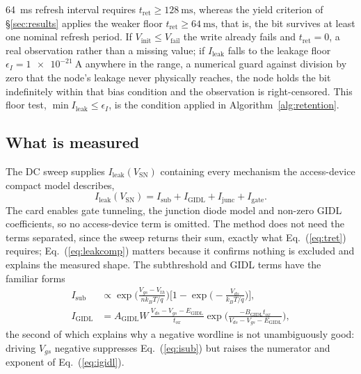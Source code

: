\documentclass[11pt,a4paper]{article}
\newcommand{\Vsn}{V_{\mathrm{SN}}}
\newcommand{\Vfail}{V_{\mathrm{fail}}}
\newcommand{\Ileak}{I_{\mathrm{leak}}}
\newcommand{\tret}{t_{\mathrm{ret}}}
\begin{document}
\SI{64}{\milli\second} refresh interval requires $\tret\ge\SI{128}{\milli\second}$,
whereas the yield criterion of \S\ref{sec:results} applies the weaker floor
$\tret\ge\SI{64}{\milli\second}$, that is, the bit survives at least one nominal
refresh period. If $V_{\mathrm{init}}\le\Vfail$ the write already fails and
$\tret=0$, a real observation rather than a missing value; if $\Ileak$ falls to the
leakage floor $\epsilon_I=\SI{1e-21}{\ampere}$ anywhere in the range, a numerical
guard against division by zero that the node's leakage never physically reaches,
the node holds the bit indefinitely within that bias condition and the observation
is right-censored. This floor test, $\min\Ileak\le\epsilon_I$, is the condition
applied in Algorithm~\ref{alg:retention}.

\subsection{What is measured}

The DC sweep supplies $\Ileak(\Vsn)$ containing every mechanism the access-device
compact model describes,
\begin{equation}
\Ileak(\Vsn) = I_{\mathrm{sub}} + I_{\mathrm{GIDL}}
+ I_{\mathrm{junc}} + I_{\mathrm{gate}} .
\label{eq:leakcomp}
\end{equation}
The card enables gate tunneling, the junction diode model and non-zero GIDL
coefficients, so no access-device term is omitted. The method does not need the terms separated,
since the sweep returns their sum, exactly what Eq.~(\ref{eq:tret}) requires;
Eq.~(\ref{eq:leakcomp}) matters because it confirms nothing is excluded and
explains the measured shape. The subthreshold and GIDL terms have the familiar
forms
\begin{align}
I_{\mathrm{sub}} &\propto
\exp\!\Big(\tfrac{V_{gs}-V_{th}}{n k_BT/q}\Big)
\Big[1-\exp\!\big(-\tfrac{V_{ds}}{k_BT/q}\big)\Big],
\label{eq:isub}\\
I_{\mathrm{GIDL}} &= A_{\mathrm{GIDL}} W\,
\frac{V_{ds}-V_{gs}-E_{\mathrm{GIDL}}}{t_{ox}}
\exp\!\Big(\tfrac{-B_{\mathrm{GIDL}} t_{ox}}{V_{ds}-V_{gs}-E_{\mathrm{GIDL}}}\Big),
\label{eq:igidl}
\end{align}
the second of which explains why a negative wordline is not unambiguously good:
driving $V_{gs}$ negative suppresses Eq.~(\ref{eq:isub}) but raises the numerator
and exponent of Eq.~(\ref{eq:igidl}).
\end{document}
